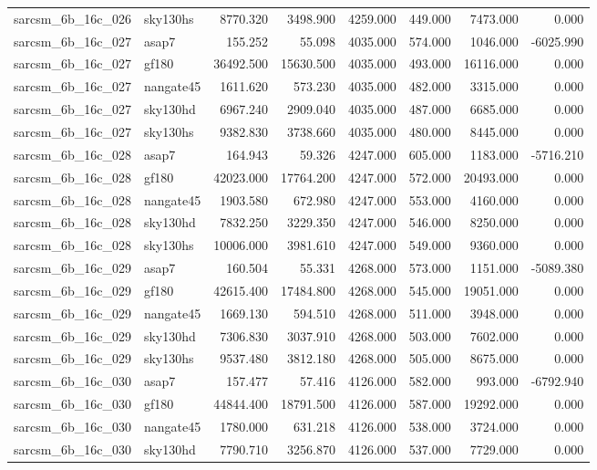 \begin{tabular}{llrrrrrr}
sarcsm\_6b\_16c\_026 & sky130hs & 8770.320 & 3498.900 & 4259.000 & 449.000 & 7473.000 & 0.000 \\
sarcsm\_6b\_16c\_027 & asap7 & 155.252 & 55.098 & 4035.000 & 574.000 & 1046.000 & -6025.990 \\
sarcsm\_6b\_16c\_027 & gf180 & 36492.500 & 15630.500 & 4035.000 & 493.000 & 16116.000 & 0.000 \\
sarcsm\_6b\_16c\_027 & nangate45 & 1611.620 & 573.230 & 4035.000 & 482.000 & 3315.000 & 0.000 \\
sarcsm\_6b\_16c\_027 & sky130hd & 6967.240 & 2909.040 & 4035.000 & 487.000 & 6685.000 & 0.000 \\
sarcsm\_6b\_16c\_027 & sky130hs & 9382.830 & 3738.660 & 4035.000 & 480.000 & 8445.000 & 0.000 \\
sarcsm\_6b\_16c\_028 & asap7 & 164.943 & 59.326 & 4247.000 & 605.000 & 1183.000 & -5716.210 \\
sarcsm\_6b\_16c\_028 & gf180 & 42023.000 & 17764.200 & 4247.000 & 572.000 & 20493.000 & 0.000 \\
sarcsm\_6b\_16c\_028 & nangate45 & 1903.580 & 672.980 & 4247.000 & 553.000 & 4160.000 & 0.000 \\
sarcsm\_6b\_16c\_028 & sky130hd & 7832.250 & 3229.350 & 4247.000 & 546.000 & 8250.000 & 0.000 \\
sarcsm\_6b\_16c\_028 & sky130hs & 10006.000 & 3981.610 & 4247.000 & 549.000 & 9360.000 & 0.000 \\
sarcsm\_6b\_16c\_029 & asap7 & 160.504 & 55.331 & 4268.000 & 573.000 & 1151.000 & -5089.380 \\
sarcsm\_6b\_16c\_029 & gf180 & 42615.400 & 17484.800 & 4268.000 & 545.000 & 19051.000 & 0.000 \\
sarcsm\_6b\_16c\_029 & nangate45 & 1669.130 & 594.510 & 4268.000 & 511.000 & 3948.000 & 0.000 \\
sarcsm\_6b\_16c\_029 & sky130hd & 7306.830 & 3037.910 & 4268.000 & 503.000 & 7602.000 & 0.000 \\
sarcsm\_6b\_16c\_029 & sky130hs & 9537.480 & 3812.180 & 4268.000 & 505.000 & 8675.000 & 0.000 \\
sarcsm\_6b\_16c\_030 & asap7 & 157.477 & 57.416 & 4126.000 & 582.000 & 993.000 & -6792.940 \\
sarcsm\_6b\_16c\_030 & gf180 & 44844.400 & 18791.500 & 4126.000 & 587.000 & 19292.000 & 0.000 \\
sarcsm\_6b\_16c\_030 & nangate45 & 1780.000 & 631.218 & 4126.000 & 538.000 & 3724.000 & 0.000 \\
sarcsm\_6b\_16c\_030 & sky130hd & 7790.710 & 3256.870 & 4126.000 & 537.000 & 7729.000 & 0.000 \\

\end{tabular}
